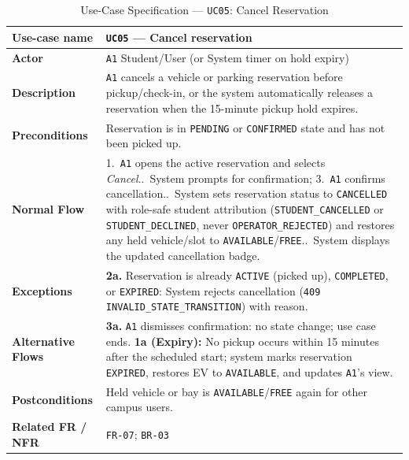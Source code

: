 \begin{table}[H]
  \centering
  \singlespacing\footnotesize
  \caption{Use-Case Specification --- \texttt{UC05}: Cancel Reservation}
  \label{tab:uc05}
  \renewcommand{\arraystretch}{1.13}
  \begin{tabularx}{\textwidth}{|L{2.9cm}|Y|}
    \hline
    \textbf{Use-case name} & \textbf{\texttt{UC05} --- Cancel reservation} \\
    \hline
    \textbf{Actor} & \texttt{A1} Student/User (or System timer on hold expiry) \\
    \hline
    \textbf{Description} & \texttt{A1} cancels a vehicle or parking reservation before pickup/check-in, or the system automatically releases a reservation when the 15-minute pickup hold expires. \\
    \hline
    \textbf{Preconditions} & Reservation is in \texttt{PENDING} or \texttt{CONFIRMED} state and has not been picked up. \\
    \hline
    \textbf{Normal Flow} & 1.\ \texttt{A1} opens the active reservation and selects \textit{Cancel}..\ System prompts for confirmation; 3.\ \texttt{A1} confirms cancellation..\ System sets reservation status to \texttt{CANCELLED} with role-safe student attribution (\texttt{STUDENT\_\allowbreak CANCELLED} or \texttt{STUDENT\_\allowbreak DECLINED}, never \texttt{OPERATOR\_\allowbreak REJECTED}) and restores any held vehicle/slot to \texttt{AVAILABLE}/\texttt{FREE}..\ System displays the updated cancellation badge. \\
    \hline
    \textbf{Exceptions} & \textbf{2a.} Reservation is already \texttt{ACTIVE} (picked up), \texttt{COMPLETED}, or \texttt{EXPIRED}: System rejects cancellation (\texttt{409 INVALID\_\allowbreak STATE\_\allowbreak TRANSITION}) with reason. \\
    \hline
    \textbf{Alternative Flows} & \textbf{3a.} \texttt{A1} dismisses confirmation: no state change; use case ends.\newline
    \textbf{1a (Expiry):} No pickup occurs within 15 minutes after the scheduled start; system marks reservation \texttt{EXPIRED}, restores EV to \texttt{AVAILABLE}, and updates \texttt{A1}'s view. \\
    \hline
    \textbf{Postconditions} & Held vehicle or bay is \texttt{AVAILABLE}/\texttt{FREE} again for other campus users. \\
    \hline
    \textbf{Related FR / NFR} & \texttt{FR-07}; \texttt{BR-03} \\
    \hline
  \end{tabularx}
\end{table}

